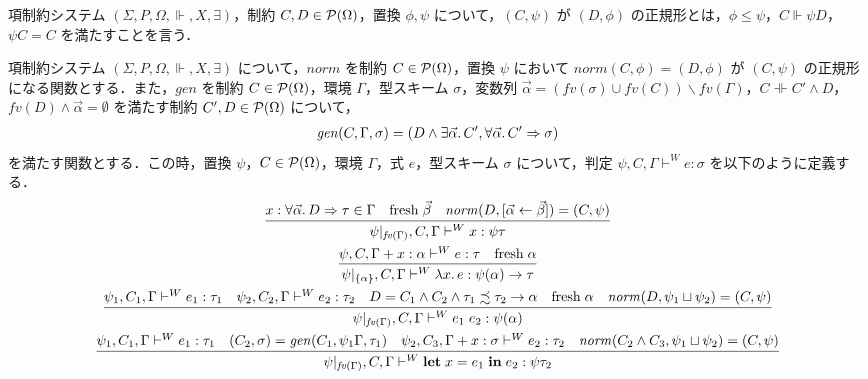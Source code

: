 \begin{definition}[正規形]
  項制約システム $(\Sigma, P, \Omega, \Vdash, X, \exists)$，制約 $C, D \in \mathcal{P}(\Omega)$，置換 $\phi, \psi$ について，$(C, \psi)$ が $(D, \phi)$ の正規形とは，$\phi \leq \psi$，$C \Vdash \psi D$，$\psi C = C$ を満たすことを言う．
\end{definition}

\begin{definition}
  項制約システム $(\Sigma, P, \Omega, \Vdash, X, \exists)$ について，$\mathit{norm}$ を制約 $C \in \mathcal{P}(\Omega)$，置換 $\psi$ において $\mathit{norm}(C, \phi) = (D, \phi)$ が $(C, \psi)$ の正規形になる関数とする．また，$\mathit{gen}$ を制約 $C \in \mathcal{P}(\Omega)$，環境 $\Gamma$，型スキーム $\sigma$，変数列 $\vec{\alpha} = (\mathit{fv}(\sigma) \cup \mathit{fv}(C)) \backslash \mathit{fv}(\Gamma)$，$C \dashVdash C' \land D$，$\mathit{fv}(D) \land \vec{\alpha} = \emptyset$ を満たす制約 $C', D \in \mathcal{P}(\Omega)$ について，
  \begin{align*}
    \mathit{gen}(C, \Gamma, \sigma) = (D \land \exists \vec{\alpha}\ldotp C', \forall \vec{\alpha}\ldotp C' \Rightarrow \sigma)
  \end{align*}
  を満たす関数とする．この時，置換 $\psi$，$C \in \mathcal{P}(\Omega)$，環境 $\Gamma$，式 $e$，型スキーム $\sigma$ について，判定 $\psi, C, \Gamma \vdash^W e: \sigma$ を以下のように定義する．
  \begin{gather*}
    \infer{\psi|_{\mathit{fv}(\Gamma)}, C, \Gamma \vdash^W x: \psi \tau}{
      x: \forall \vec{\alpha}\ldotp D \Rightarrow \tau \in \Gamma
      &
      \mathrm{fresh}\; \vec{\beta}
      &
      \mathit{norm}(D, [\vec{\alpha} \assign \vec{\beta}]) = (C, \psi)
    }
    \\
    \infer{\psi|_{\{\alpha\}}, C, \Gamma \vdash^W \lambda x\ldotp e: \psi(\alpha) \to \tau}{
      \psi, C, \Gamma + x: \alpha \vdash^W e: \tau
      &
      \mathrm{fresh}\; \alpha
    }
    \\
    \infer{\psi|_{\mathit{fv}(\Gamma)}, C, \Gamma \vdash^W e_1\; e_2: \psi(\alpha)}{
      \psi_1, C_1, \Gamma\vdash^W e_1: \tau_1
      &
      \psi_2, C_2, \Gamma\vdash^W e_2: \tau_2
      &
      D = C_1 \land C_2 \land \tau_1 \precsim \tau_2 \to \alpha
      &
      \mathrm{fresh}\; \alpha
      &
      \mathit{norm}(D, \psi_1 \sqcup \psi_2) = (C, \psi)
    }
    \\
    \infer{\psi|_{\mathit{fv}(\Gamma)}, C, \Gamma \vdash^W \mathbf{let}\; x = e_1\; \mathbf{in}\; e_2: \psi\tau_2}{
      \psi_1, C_1, \Gamma\vdash^W e_1: \tau_1
      &
      (C_2, \sigma) = \mathit{gen}(C_1, \psi_1\Gamma, \tau_1)
      &
      \psi_2, C_3, \Gamma + x:\sigma \vdash^W e_2: \tau_2
      &
      \mathit{norm}(C_2 \land C_3, \psi_1 \sqcup \psi_2) = (C, \psi)
    }
  \end{gather*}
\end{definition}
